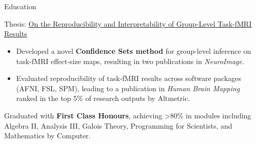 \documentclass{my_cv}
\begin{document}
\section{\faGraduationCap}{Education}


%
{\begin{addmargin}[2em]{1em}
    Thesis: \href{https://doi.org/10.31237/osf.io/mj7qa}{On the Reproducibility and Interpretability of Group-Level Task-fMRI Results} 
    \begin{itemize}[topsep=0pt,itemsep=0pt,partopsep=0pt, parsep=0pt] 
        \item Developed a novel \textbf{Confidence Sets method} for group-level inference on task-fMRI effect-size maps, resulting in two publications in \textit{NeuroImage}.
        \item Evaluated reproducibility of task-fMRI results across software packages (AFNI, FSL, SPM), leading to a publication in \textit{Human Brain Mapping} ranked in the top 5\% of research outputs by Altmetric.
    \end{itemize}
\end{addmargin}}

%
{\begin{addmargin}[2em]{1em}
    Graduated with \textbf{First Class Honours}, achieving >80\% in modules including Algebra II, Analysis III, Galois Theory, Programming for Scientists, and Mathematics by Computer.
\end{addmargin}}
\end{document}
